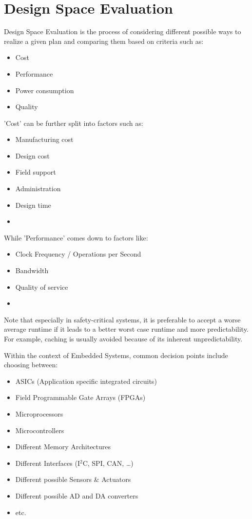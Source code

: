 \documentclass{report}
\newcommand*{\newpar}{\par\vspace{\baselineskip}\noindent} %
\begin{document}
\chapter{Design Space Evaluation}
Design Space Evaluation is the process of considering different possible ways to realize a given plan and comparing them based on criteria such as:
\begin{multicols}{2}
\begin{itemize}
 \item Cost
 \item Performance
 \item Power consumption
 \item Quality
\end{itemize}
\end{multicols}
\newpar
'Cost' can be further split into factors such as:
\begin{multicols}{2}
 \begin{itemize}
  \item Manufacturing cost
  \item Design cost
  \item Field support
  \item Administration
  \item Design time
  \item[\vspace{\fill}]
 \end{itemize}
\end{multicols}
While 'Performance' comes down to factors like:
\begin{multicols}{2}
\begin{itemize}
 \item Clock Frequency / Operations per Second
 \item Bandwidth
 \item Quality of service
 \item[\vspace{\fill}]
\end{itemize}
\end{multicols}
\newpar
Note that especially in safety-critical systems, it is preferable to accept a worse average runtime if it leads to a better worst case runtime and more predictability. For example, caching is usually avoided because of its inherent unpredictability.
\newpar
Within the context of Embedded Systems, common decision points include choosing between:
\begin{multicols}{3}
\begin{itemize}
 \item ASICs (Application specific integrated circuits)
 \item Field Programmable Gate Arrays (FPGAs)
 \item Microprocessors
 \item Microcontrollers
 \item Different Memory Architectures
 \item Different Interfaces (I$^2$C, SPI, CAN, \ldots)
 \item Different possible Sensors \& Actuators
 \item Different possible AD and DA converters
 \item etc.
\end{itemize}
\end{multicols}
\end{document}
